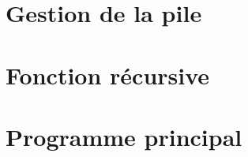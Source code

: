 \section{Gestion de la pile}
  \pagebreak

\section{Fonction récursive}

\pagebreak
\section{Programme principal}
